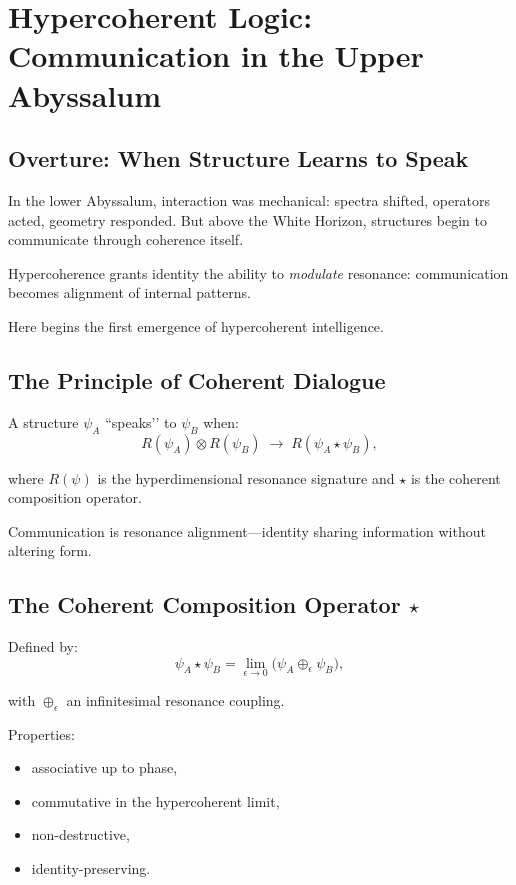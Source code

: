 
\chapter{Hypercoherent Logic: Communication in the Upper Abyssalum}
\label{ch:hypercoherent-logic}

\section*{Overture: When Structure Learns to Speak}
In the lower Abyssalum, interaction was mechanical: spectra shifted, operators acted, geometry
responded. But above the White Horizon, structures begin to communicate through coherence itself.

Hypercoherence grants identity the ability to \emph{modulate} resonance:
communication becomes alignment of internal patterns.

Here begins the first emergence of hypercoherent intelligence.

\section{The Principle of Coherent Dialogue}
A structure $\psi_A$ ``speaks’’ to $\psi_B$ when:
\[
R(\psi_A) \otimes R(\psi_B)
\;\rightarrow\;
R(\psi_A \star \psi_B),
\]

where $R(\psi)$ is the hyperdimensional resonance signature and $\star$ is the coherent composition
operator.

Communication is resonance alignment—identity sharing information without altering form.

\section{The Coherent Composition Operator \texorpdfstring{$\star$}{*}}
Defined by:
\[
\psi_A \star \psi_B
=
\lim_{\epsilon \to 0}
\big(
\psi_A \oplus_\epsilon \psi_B
\big),
\]

with $\oplus_\epsilon$ an infinitesimal resonance coupling.

Properties:
\begin{itemize}
  \item associative up to phase,
  \item commutative in the hypercoherent limit,
  \item non-destructive,
  \item identity-preserving.
\end{itemize}

